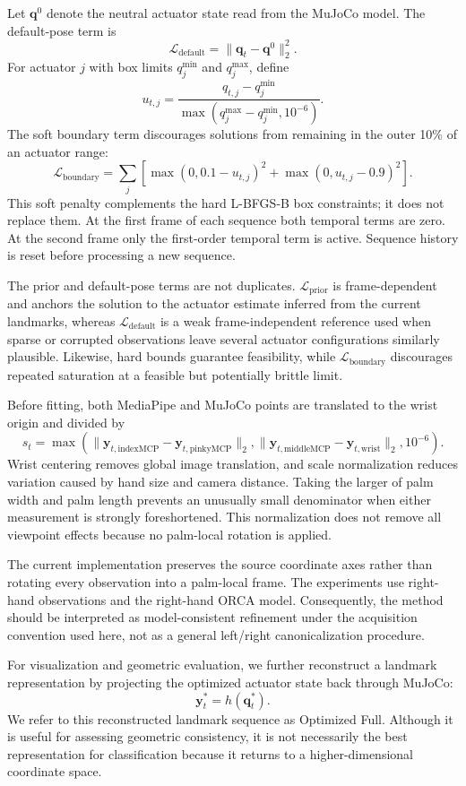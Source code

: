 \documentclass[11pt]{article}
\begin{document}
Let $\mathbf q^{0}$ denote the neutral actuator state read from the MuJoCo model. The default-pose term is
\[
\mathcal{L}_{\text{default}}=\|\mathbf q_t-\mathbf q^{0}\|_2^2.
\]
For actuator $j$ with box limits $q_j^{\min}$ and $q_j^{\max}$, define
\[
u_{t,j}=\frac{q_{t,j}-q_j^{\min}}{\max(q_j^{\max}-q_j^{\min},10^{-6})}.
\]
The soft boundary term discourages solutions from remaining in the outer 10\% of an actuator range:
\[
\mathcal{L}_{\text{boundary}}
=\sum_j\left[\max(0,0.1-u_{t,j})^2+\max(0,u_{t,j}-0.9)^2\right].
\]
This soft penalty complements the hard L-BFGS-B box constraints; it does not replace them. At the first frame of each sequence both temporal terms are zero. At the second frame only the first-order temporal term is active. Sequence history is reset before processing a new sequence.

The prior and default-pose terms are not duplicates. $\mathcal L_{\text{prior}}$ is frame-dependent and anchors the solution to the actuator estimate inferred from the current landmarks, whereas $\mathcal L_{\text{default}}$ is a weak frame-independent reference used when sparse or corrupted observations leave several actuator configurations similarly plausible. Likewise, hard bounds guarantee feasibility, while $\mathcal L_{\text{boundary}}$ discourages repeated saturation at a feasible but potentially brittle limit.

Before fitting, both MediaPipe and MuJoCo points are translated to the wrist origin and divided by
\[
s_t=\max\!\left(\|\mathbf y_{t,\mathrm{indexMCP}}-\mathbf y_{t,\mathrm{pinkyMCP}}\|_2,
\|\mathbf y_{t,\mathrm{middleMCP}}-\mathbf y_{t,\mathrm{wrist}}\|_2,10^{-6}\right).
\]
Wrist centering removes global image translation, and scale normalization reduces variation caused by hand size and camera distance. Taking the larger of palm width and palm length prevents an unusually small denominator when either measurement is strongly foreshortened. This normalization does not remove all viewpoint effects because no palm-local rotation is applied.

The current implementation preserves the source coordinate axes rather than rotating every observation into a palm-local frame. The experiments use right-hand observations and the right-hand ORCA model. Consequently, the method should be interpreted as model-consistent refinement under the acquisition convention used here, not as a general left/right canonicalization procedure.

For visualization and geometric evaluation, we further reconstruct a landmark representation by projecting the optimized actuator state back through MuJoCo:
\[
\mathbf{y}_t^* = h(\mathbf{q}_t^*).
\]
We refer to this reconstructed landmark sequence as Optimized Full. Although it is useful for assessing geometric consistency, it is not necessarily the best representation for classification because it returns to a higher-dimensional coordinate space.
\end{document}
